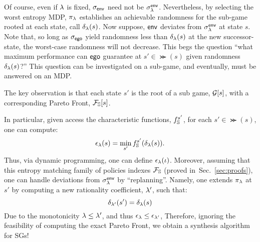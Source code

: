 Of course, even if $\lambda$ is fixed, ${\sigma_{\mathsf{env}}}$ need not be
$\sigma^{\mathsf{env}}_\lambda$. Nevertheless,  by selecting the worst
entropy MDP, $\pi_\lambda$ establishes an achievable randomness for the
sub-game rooted at each state, call $\delta_\lambda(s)$. Now suppose,
$\mathsf{env}$ deviates from $\sigma_\lambda^{\mathsf{env}}$ at state $s$. Note that, so
long as ${\sigma_{\mathsf{ego}}}$  yield randomness less than
$\delta_\lambda(s)$ at the new successor-state, the worst-case randomness will not decrease.
This begs the question ``what maximum performance can $\mathsf{ego}$ guarantee at $s' \in
\Succ(s)$ given randomness $\delta_\lambda(s)$?'' This question can be investigated on a sub-game, and eventually, must be answered on an MDP. 
\begin{mdframed}
  The key observation is that each state $s'$ is the root of a sub
  game, $\mathcal{G}[s]$, with a corresponding Pareto Front,
  $\mathcal{F}_{\mathbb{S}}[s]$.
\end{mdframed}
In particular, given access the characteristic functions,
$f_{\mathbb{S}}^{s'}$, for each $s' \in \Succ(s)$, one can compute:
\begin{equation}\label{eq:performance_lookup}
  \epsilon_\rat(s) = \min_{s'} f_\solutions^{s'}(\delta_\rat(s)).
\end{equation}
Thus, via dynamic programming, one can define $\epsilon_\lambda(\iota)$.
Moreover, assuming that this entropy matching family of policies
indexes $\mathcal{F}_{\mathbb{S}}$ (proved in~Sec.~\ref{sec:proofs}), one can handle
deviations from $\sigma^{\mathsf{env}}_\lambda$ by ``replanning''. Namely, one
extends $\pi_\lambda$ at $s'$ by computing a new rationality coefficient,
$\lambda'$, such that:
\begin{equation}
  \delta_{\lambda'}(s') = \delta_{\lambda}(s)
\end{equation}
Due to the monotonicity $\lambda \leq \lambda'$, and thus $\epsilon_\lambda \leq \epsilon_{\lambda'}$, 
Therefore, ignoring the feasibility of computing the exact Pareto
Front, we obtain a synthesis algorithm for SGs!

